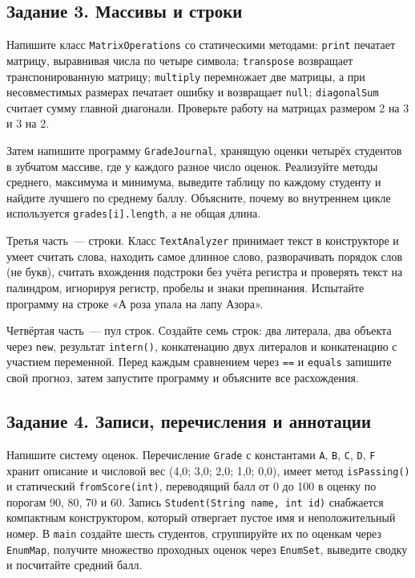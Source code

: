 \subsection*{Задание 3. Массивы и строки}

Напишите класс \texttt{MatrixOperations} со статическими методами:
\texttt{print} печатает матрицу, выравнивая числа по четыре символа;
\texttt{transpose} возвращает транспонированную матрицу; \texttt{multiply}
перемножает две матрицы, а при несовместимых размерах печатает ошибку и
возвращает \texttt{null}; \texttt{diagonalSum} считает сумму главной
диагонали. Проверьте работу на матрицах размером 2 на 3 и 3 на 2.

Затем напишите программу \texttt{GradeJournal}, хранящую оценки четырёх
студентов в зубчатом массиве, где у каждого разное число оценок. Реализуйте
методы среднего, максимума и минимума, выведите таблицу по каждому студенту и
найдите лучшего по среднему баллу. Объясните, почему во внутреннем цикле
используется \texttt{grades[i].length}, а не общая длина.

Третья часть~--- строки. Класс \texttt{TextAnalyzer} принимает текст в
конструкторе и умеет считать слова, находить самое длинное слово,
разворачивать порядок слов (не букв), считать вхождения подстроки без учёта
регистра и проверять текст на палиндром, игнорируя регистр, пробелы и знаки
препинания. Испытайте программу на строке «А роза упала на лапу Азора».

Четвёртая часть~--- пул строк. Создайте семь строк: два литерала, два объекта
через \texttt{new}, результат \texttt{intern()}, конкатенацию двух литералов и
конкатенацию с участием переменной. Перед каждым сравнением через \texttt{==}
и \texttt{equals} запишите свой прогноз, затем запустите программу и объясните
все расхождения.

\subsection*{Задание 4. Записи, перечисления и аннотации}

Напишите систему оценок. Перечисление \texttt{Grade} с константами
\texttt{A}, \texttt{B}, \texttt{C}, \texttt{D}, \texttt{F} хранит описание и
числовой вес (4,0; 3,0; 2,0; 1,0; 0,0), имеет метод \texttt{isPassing()} и
статический \texttt{fromScore(int)}, переводящий балл от 0 до 100 в оценку по
порогам 90, 80, 70 и 60. Запись \texttt{Student(String name, int id)}
снабжается компактным конструктором, который отвергает пустое имя и
неположительный номер. В \texttt{main} создайте шесть студентов, сгруппируйте
их по оценкам через \texttt{EnumMap}, получите множество проходных оценок
через \texttt{EnumSet}, выведите сводку и посчитайте средний балл.

